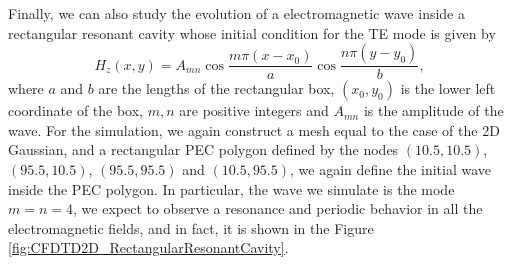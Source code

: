 \documentclass[12pt, oneside]{book}
\begin{document}
\newpage
Finally, we can also study the evolution of a electromagnetic wave inside a rectangular resonant cavity whose initial condition for the TE mode is given by \cite{pozar2012microwave}
\begin{equation}
    H_z(x, y) = A_{mn}\cos\dfrac{m \pi (x-x_0)}{a} \cos\dfrac{n \pi (y-y_0)}{b},
\label{eq:ResonantRectangularCavity}
\end{equation}
where $a$ and $b$ are the lengths of the rectangular box, $(x_0, y_0)$ is the lower left coordinate of the box, $m, n$ are positive integers and $A_{mn}$ is the amplitude of the wave. For the simulation, we again construct a mesh equal to the case of the 2D Gaussian, and a rectangular PEC polygon defined by the nodes $(10.5,10.5)$, $(95.5,10.5)$, $(95.5, 95.5)$ and $(10.5, 95.5)$, we again define the initial wave inside the PEC polygon. In particular, the wave we simulate is the mode $m = n = 4$, we expect to observe a resonance and periodic behavior in all the electromagnetic fields, and in fact, it is shown in the Figure \ref{fig:CFDTD2D_RectangularResonantCavity}.
\end{document}
